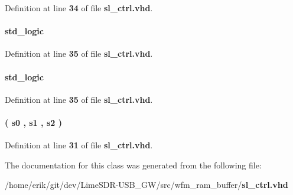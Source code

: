 Definition at line {\bf 34} of file {\bf sl\+\_\+ctrl.\+vhd}.

\paragraph[{sl\+\_\+n}]{ {\bfseries \textcolor{comment}{std\+\_\+logic}\textcolor{vhdlchar}{ }} \hspace{0.3cm}{\ttfamily [Signal]}}\label{classsl__ctrl_1_1arch_a92185ddb026a11387c5336dfff58e61d}


Definition at line {\bf 35} of file {\bf sl\+\_\+ctrl.\+vhd}.

\paragraph[{sl\+\_\+r}]{ {\bfseries \textcolor{comment}{std\+\_\+logic}\textcolor{vhdlchar}{ }} \hspace{0.3cm}{\ttfamily [Signal]}}\label{classsl__ctrl_1_1arch_a76d32c0e5a82e2c84e67a036f75d6c5b}


Definition at line {\bf 35} of file {\bf sl\+\_\+ctrl.\+vhd}.

\paragraph[{state\+\_\+type}]{ {\bfseries \textcolor{vhdlchar}{(}\textcolor{vhdlchar}{ }\textcolor{vhdlchar}{s0}\textcolor{vhdlchar}{ }\textcolor{vhdlchar}{,}\textcolor{vhdlchar}{ }\textcolor{vhdlchar}{s1}\textcolor{vhdlchar}{ }\textcolor{vhdlchar}{,}\textcolor{vhdlchar}{ }\textcolor{vhdlchar}{s2}\textcolor{vhdlchar}{ }\textcolor{vhdlchar}{)}\textcolor{vhdlchar}{ }} \hspace{0.3cm}{\ttfamily [Type]}}\label{classsl__ctrl_1_1arch_a5439e3e20ec99b6eb5428e2edd18d3ca}


Definition at line {\bf 31} of file {\bf sl\+\_\+ctrl.\+vhd}.



The documentation for this class was generated from the following file\+:\begin{DoxyCompactItemize}
\item 
/home/erik/git/dev/\+Lime\+S\+D\+R-\/\+U\+S\+B\+\_\+\+G\+W/src/wfm\+\_\+ram\+\_\+buffer/{\bf sl\+\_\+ctrl.\+vhd}\end{DoxyCompactItemize}
